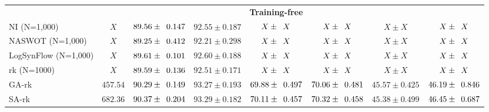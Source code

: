 \documentclass[sigconf]{acmart}
\begin{document}
\begin{table*}[htb]
\begin{tabular}{@{}lccccccc@{}}
        &&&&\textbf{Training-free}&&&\\
        NI (N=1,000)         & $X$ & $89.56\pm \z{0.147}$ & $92.55\pm 0.187$ & $X\pm \z{X}$ & $X\pm \z{X}$ & $X\pm X$ & $X\pm \z{X}$ \\ 
        NASWOT (N=1,000)     & $X$ & $89.25\pm \z{0.412}$ & $92.21\pm 0.298$ & $X\pm \z{X}$ & $X\pm \z{X}$ & $X\pm X$ & $X\pm \z{X}$ \\ 
        LogSynFlow (N=1,000) & $X$ & $89.61\pm \z{0.101}$ & $92.60\pm 0.188$ & $X\pm \z{X}$ & $X\pm \z{X}$ & $X\pm X$ & $X\pm \z{X}$ \\ 
        rk (N=1000)          & $X$ & $89.59\pm \z{0.136}$ & $92.51\pm 0.171$ & $X\pm \z{X}$ & $X\pm \z{X}$ & $X\pm X$ & $X\pm \z{X}$ \\ 
        GA-rk                & $457.54$ & $90.29\pm \z{0.149}$ & $93.27\pm0.193$ & $69.88\pm \z{0.497}$ & $70.06\pm \z{0.481}$ & $45.57\pm 0.425$ & $46.19\pm \z{0.846}$ \\ 
        SA-rk                & $682.36$ & $90.37\pm \z{0.204}$ & $93.29\pm0.182$ & $70.11\pm \z{0.457}$ & $70.32\pm \z{0.458}$ & $45.38\pm 0.499$ & $46.45\pm \z{0.687}$ \\ \bottomrule
        \end{tabular}
        \label{table:overall_sss}
          \vspace{-\baselineskip}
      \end{table*}
\end{document}
